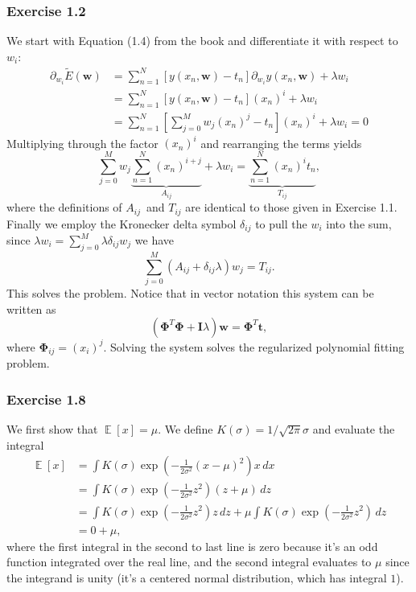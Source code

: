\documentclass[12pt, a4paper]{article}
\newcommand{\vect}[1]{\bm{#1}}
\DeclareMathOperator{\E}{\mathbb{E}}
\begin{document}
\subsubsection*{Exercise 1.2}
We start with Equation (1.4) from the book and differentiate it with respect to $w_i$:
\begin{align*}
	\partial_{w_i} \tilde{E}(\vect{w})
	&= \sum_{n=1}^{N} \left[ y(x_n, \vect{w}) - t_n \right] \partial_{w_i} y(x_n, \vect{w}) + \lambda w_i \\
	&= \sum_{n=1}^{N} \left[ y(x_n, \vect{w}) - t_n \right] (x_n)^i + \lambda w_i \\
	&= \sum_{n=1}^{N} \left[ \sum_{j=0}^{M} w_j (x_n)^j - t_n \right] (x_n)^i + \lambda w_i = 0
\end{align*}
Multiplying through the factor $(x_n)^i$ and rearranging the terms yields
\begin{equation*}
	\sum_{j=0}^{M} w_j \underbrace{\sum_{n=1}^{N} (x_n)^{i+j}}_{A_{ij}}
	+
	\lambda w_i = \underbrace{\sum_{n=1}^{N}  (x_n)^i t_n}_{T_{ij}},
\end{equation*}
where the definitions of $A_{ij}$ and $T_{ij}$ are identical to those given in Exercise 1.1.
Finally we employ the Kronecker delta symbol $\delta_{ij}$ to pull the $w_i$ into the sum, since $\lambda w_i = \sum_{j=0}^{M} \lambda \delta_{ij} w_j$ we have
\begin{equation*}
	\sum_{j=0}^{M}  \left( A_{ij} + \delta_{ij} \lambda \right) w_j
	 = T_{ij}.
\end{equation*}
This solves the problem.
Notice that in vector notation this system can be written as 
\begin{equation*}
	\left( \vect{\Phi}^T \vect{\Phi} + \vect{I}\lambda \right) \vect{w} = \vect{\Phi}^T \vect{t},
\end{equation*}
where $\vect{\Phi}_{ij}= (x_i)^j$.
Solving the system solves the regularized polynomial fitting problem.


\subsubsection*{Exercise 1.8}
We first show that $\E \left[x\right] = \mu$.
We define $K(\sigma) = 1 / \sqrt{2 \pi} \sigma$ and evaluate the integral
\begin{align*}
	\E \left[x\right] &= \int K(\sigma) \exp \left( - \frac{1}{2 \sigma^2} \left(x - \mu \right)^2 \right) x \, dx \\
	&= \int K(\sigma) \exp \left( - \frac{1}{2 \sigma^2} z^2 \right) (z + \mu) \, dz \tag{change of variables}\\
	&= \int K(\sigma) \exp \left( - \frac{1}{2 \sigma^2} z^2 \right) z \, dz 
	+
	 \mu \int K(\sigma) \exp \left( - \frac{1}{2 \sigma^2} z^2 \right) \, dz \\
	 & = 0 + \mu,
\end{align*}
where the first integral in the second to last line is zero because it's an odd function integrated over the real line, and the second integral evaluates to $\mu$ since the integrand is unity (it's a centered normal distribution, which has integral $1$).
\end{document}
